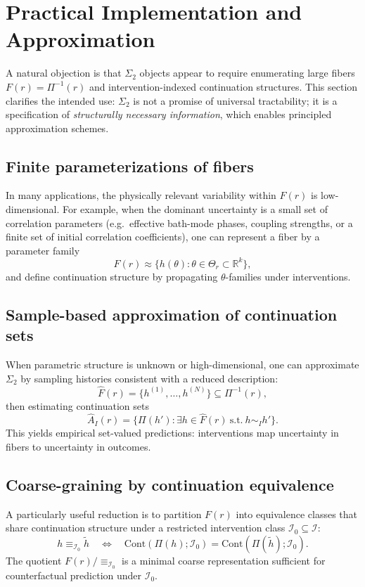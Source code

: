 \section{Practical Implementation and Approximation}
\label{sec:practical}

A natural objection is that $\Sigma_2$ objects appear to require enumerating large fibers
$F(r)=\Pi^{-1}(r)$ and intervention-indexed continuation structures. This section clarifies the
intended use: $\Sigma_2$ is not a promise of universal tractability; it is a specification of
\emph{structurally necessary information}, which enables principled approximation schemes.

\subsection{Finite parameterizations of fibers}
\label{sec:finite-param}

In many applications, the physically relevant variability within $F(r)$ is low-dimensional.
For example, when the dominant uncertainty is a small set of correlation parameters (e.g.\
effective bath-mode phases, coupling strengths, or a finite set of initial correlation
coefficients), one can represent a fiber by a parameter family
\[
  F(r) \approx \{ h(\theta) : \theta \in \Theta_r \subset \mathbb{R}^k \},
\]
and define continuation structure by propagating $\theta$-families under interventions.

\subsection{Sample-based approximation of continuation sets}
\label{sec:sampling}

When parametric structure is unknown or high-dimensional, one can approximate $\Sigma_2$ by
sampling histories consistent with a reduced description:
\[
  \widehat{F}(r) = \{ h^{(1)},\dots,h^{(N)} \} \subseteq \Pi^{-1}(r),
\]
then estimating continuation sets
\[
  \widehat{A}_I(r) = \{ \Pi(h') : \exists h\in \widehat{F}(r)\ \text{s.t.}\ h \sim_I h' \}.
\]
This yields empirical set-valued predictions: interventions map uncertainty in fibers to
uncertainty in outcomes.

\subsection{Coarse-graining by continuation equivalence}
\label{sec:coarse-grain}

A particularly useful reduction is to partition $F(r)$ into equivalence classes that share
continuation structure under a restricted intervention class $\mathcal{I}_0 \subseteq
\mathcal{I}$:
\[
  h \equiv_{\mathcal{I}_0} \tilde{h}
  \quad \Longleftrightarrow \quad
  \mathrm{Cont}(\Pi(h);\mathcal{I}_0)=\mathrm{Cont}(\Pi(\tilde{h});\mathcal{I}_0).
\]
The quotient $F(r)/\!\equiv_{\mathcal{I}_0}$ is a minimal coarse representation sufficient for
counterfactual prediction under $\mathcal{I}_0$.

